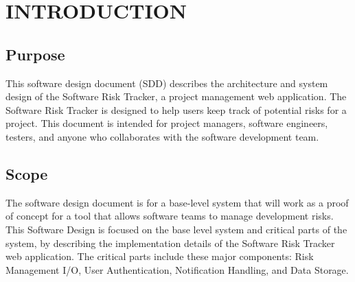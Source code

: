 \documentclass[letterpaper,12pt,oneside,listof=totoc,parskip=full]{scrreprt}
\begin{document}
%
%
%

\chapter{INTRODUCTION}

\section{Purpose}

This software design document (SDD) describes the architecture and system design of the Software Risk Tracker, a project management web application. The Software Risk Tracker is designed to help users keep track of potential risks for a project. This document is intended for project managers, software engineers, testers, and anyone who collaborates with the software development team.

\section{Scope}

The software design document is for a base-level system that will work as a proof of concept for a tool that allows software teams to manage development risks. This Software Design is focused on the base level system and critical parts of the system, by describing the implementation details of the Software Risk Tracker web application. The critical parts include these major components: Risk Management I/O, User Authentication, Notification Handling, and Data Storage.\\
\end{document}
